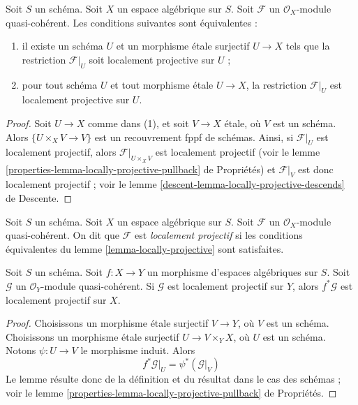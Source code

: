 \begin{lemma}
\label{lemma-locally-projective}
Soit $S$ un schéma. Soit $X$ un espace algébrique sur $S$.
Soit $\mathcal{F}$ un $\mathcal{O}_X$-module quasi-cohérent.
Les conditions suivantes sont équivalentes :
\begin{enumerate}
\item il existe un schéma $U$ et un morphisme \'etale surjectif
$U \to X$ tels que la restriction $\mathcal{F}|_U$ soit localement projective
sur $U$ ;
\item pour tout schéma $U$ et tout morphisme \'etale
$U \to X$, la restriction $\mathcal{F}|_U$ est localement projective
sur $U$.
\end{enumerate}
\end{lemma}

\begin{proof}
Soit $U \to X$ comme dans (1), et soit $V \to X$ \'etale, où
$V$ est un schéma. Alors $\{U \times_X V \to V\}$ est un recouvrement fppf
de schémas. Ainsi, si $\mathcal{F}|_U$ est localement projectif, alors
$\mathcal{F}|_{U \times_X V}$ est localement projectif (voir le
lemme \ref{properties-lemma-locally-projective-pullback} de Propriétés)
et $\mathcal{F}|_V$ est donc localement projectif ; voir le
lemme \ref{descent-lemma-locally-projective-descends} de Descente.
\end{proof}

\begin{definition}
\label{definition-locally-projective}
Soit $S$ un schéma. Soit $X$ un espace algébrique sur $S$.
Soit $\mathcal{F}$ un $\mathcal{O}_X$-module quasi-cohérent.
On dit que $\mathcal{F}$ est {\it localement projectif}
si les conditions équivalentes du
lemme \ref{lemma-locally-projective}
sont satisfaites.
\end{definition}

\begin{lemma}
\label{lemma-locally-projective-pullback}
Soit $S$ un schéma.
Soit $f : X \to Y$ un morphisme d'espaces algébriques sur $S$.
Soit $\mathcal{G}$ un $\mathcal{O}_Y$-module quasi-cohérent.
Si $\mathcal{G}$ est localement projectif sur $Y$, alors $f^*\mathcal{G}$
est localement projectif sur $X$.
\end{lemma}

\begin{proof}
Choisissons un morphisme \'etale surjectif $V \to Y$, où $V$ est un schéma.
Choisissons un morphisme \'etale surjectif $U \to V \times_Y X$, où
$U$ est un schéma. Notons $\psi : U \to V$ le morphisme induit.
Alors
$$
f^*\mathcal{G}|_U = \psi^*(\mathcal{G}|_V)
$$
Le lemme résulte donc de la définition et du résultat dans le
cas des schémas ; voir le
lemme \ref{properties-lemma-locally-projective-pullback} de Propriétés.
\end{proof}





